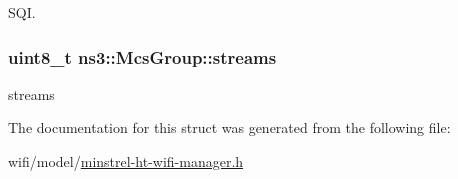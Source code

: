 S\+QI. 

\subsubsection[{\texorpdfstring{streams}{streams}}]{\setlength{\rightskip}{0pt plus 5cm}uint8\+\_\+t ns3\+::\+Mcs\+Group\+::streams}\hypertarget{structns3_1_1McsGroup_aef84b3da17bc770184cb36a48c874583}{}\label{structns3_1_1McsGroup_aef84b3da17bc770184cb36a48c874583}


streams 



The documentation for this struct was generated from the following file\+:\begin{DoxyCompactItemize}
\item 
wifi/model/\hyperlink{minstrel-ht-wifi-manager_8h}{minstrel-\/ht-\/wifi-\/manager.\+h}\end{DoxyCompactItemize}
